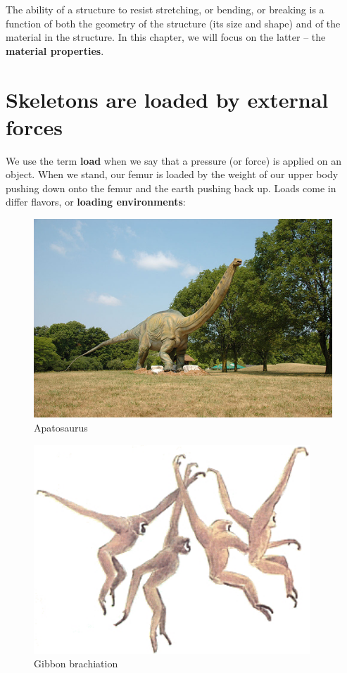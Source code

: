 \documentclass[]{book}
\begin{document}
The ability of a structure to resist stretching, or bending, or breaking
is a function of both the geometry of the structure (its size and shape)
and of the material in the structure. In this chapter, we will focus on
the latter -- the \textbf{material properties}.

\section{Skeletons are loaded by external
forces}\label{skeletons-are-loaded-by-external-forces}

We use the term \textbf{load} when we say that a pressure (or force) is
applied on an object. When we stand, our femur is loaded by the weight
of our upper body pushing down onto the femur and the earth pushing back
up. Loads come in differ flavors, or \textbf{loading environments}:

\begin{figure}
\includegraphics[width=6.94in]{images/materials_chapter/apatosaurus} \caption{Apatosaurus}\label{fig:unnamed-chunk-4}
\end{figure}

\begin{figure}
\includegraphics[width=4.08in]{images/materials_chapter/gibbon} \caption{Gibbon brachiation}\label{fig:unnamed-chunk-5}
\end{figure}
\end{document}
